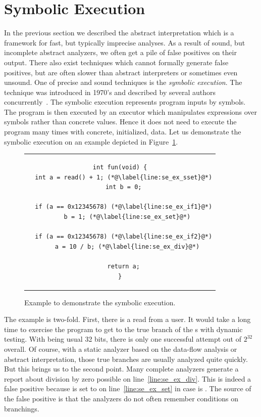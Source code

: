 \section{Symbolic Execution}\label{sec:se}
In the previous section we described the abstract interpretation which is a
framework for fast, but typically imprecise analyses. As a result of sound,
but incomplete abstract analyzers, we often get a pile of false positives on
their output.  There also exist techniques which cannot formally generate
false positives, but are often slower than abstract interpreters or sometimes
even unsound.  One of precise and sound techniques is the \emph{symbolic
execution}. The technique was introduced in 1970's and described by several
authors concurrently~\cite{se_king, se_select, se_dissect, se_clarke}. The
symbolic execution represents program inputs by symbols.  The program is then
executed by an executor which manipulates expressions over symbols rather than
concrete values. Hence it does not need to execute the program many times with
concrete, initialized, data.  Let us demonstrate the symbolic execution on an
example depicted in Figure~\ref{fig:se_example}.
\begin{figure}[htb]
\begin{center}
\begin{tabular}{c}
\begin{lstlisting}
int fun(void) {
  int a = read() + 1; (*@\label{line:se_ex_sset}@*)
  int b = 0;

  if (a == 0x12345678) (*@\label{line:se_ex_if1}@*)
    b = 1; (*@\label{line:se_ex_set}@*)

  if (a == 0x12345678) (*@\label{line:se_ex_if2}@*)
    a = 10 / b; (*@\label{line:se_ex_div}@*)

  return a;
}
\end{lstlisting}
\end{tabular}
\end{center}
  \caption{Example to demonstrate the symbolic execution.}
  \label{fig:se_example}
\end{figure}

The example is two-fold. First, there is a read from a user. It would take a
long time to exercise the program to get to the true branch of the s
with dynamic testing.  With  being usual 32 bits, there is only one
successful attempt out of $2^{32}$ overall. Of course, with a static analyzer
based on the data-flow analysis or abstract interpretation, those true
branches are usually analyzed quite quickly. But this brings us to the second
point. Many complete analyzers generate a report about division by zero
possible on line~\ref{line:se_ex_div}. This is indeed a false positive because
 is set to  on line~\ref{line:se_ex_set} in case  is
. The source of the false positive is that the analyzers do
not often remember conditions on branchings.

